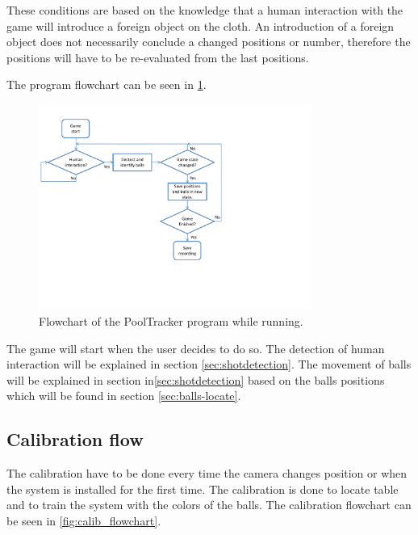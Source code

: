 These conditions are based on the knowledge that a human interaction with the game will introduce a foreign object on the cloth.  An introduction of a foreign object does not necessarily conclude a changed positions or number, therefore the positions will have to be re-evaluated from the last positions.


The program flowchart can be seen in \ref{fig:program_flowchart}.\\

\begin{figure}[H]
\begin{center}
\leavevmode
\includegraphics[width=0.8\textwidth]{images/program_flowchart}
\end{center}
\caption{Flowchart of the PoolTracker program while running.}
\label{fig:program_flowchart}
\end{figure}

The game will start when the user decides to do so. The detection of human interaction will be explained in section \ref{sec:shotdetection}. The movement of balls will be explained in section in\ref{sec:shotdetection} based on the balls positions which will be found in section \ref{sec:balls-locate}.

\subsection{Calibration flow}
The calibration have to be done every time the camera changes position or when the system is installed for the first time. The calibration is done to locate table and to train the system with the colors of the balls. The calibration flowchart can be seen in \ref{fig:calib_flowchart}.\\

